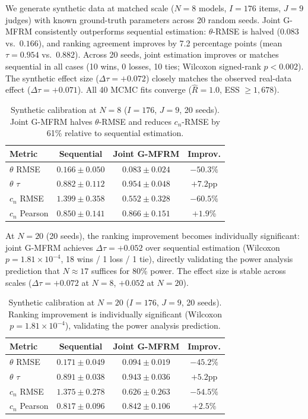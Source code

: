 We generate synthetic data at matched scale ($N = 8$ models, $I = 176$ items, $J = 9$ judges) with known ground-truth parameters across 20 random seeds. Joint G-MFRM consistently outperforms sequential estimation: $\theta$-RMSE is halved ($0.083$ vs.\ $0.166$), and ranking agreement improves by 7.2 percentage points (mean $\tau = 0.954$ vs.\ $0.882$). Across 20 seeds, joint estimation improves or matches sequential in all cases (10 wins, 0 losses, 10 ties; Wilcoxon signed-rank $p < 0.002$). The synthetic effect size ($\Delta\tau = +0.072$) closely matches the observed real-data effect ($\Delta\tau = +0.071$). All 40 MCMC fits converge ($\hat{R} = 1.0$, ESS $\geq 1{,}678$).

\begin{table}[h]
\centering
\small
\begin{tabular}{lccc}
\toprule
\textbf{Metric} & \textbf{Sequential} & \textbf{Joint G-MFRM} & \textbf{Improv.} \\
\midrule
$\theta$ RMSE & $0.166 \pm 0.050$ & $0.083 \pm 0.024$ & $-50.3\%$ \\
$\theta$ $\tau$ & $0.882 \pm 0.112$ & $0.954 \pm 0.048$ & $+7.2$pp \\
$c_n$ RMSE & $1.399 \pm 0.358$ & $0.552 \pm 0.328$ & $-60.5\%$ \\
$c_n$ Pearson & $0.850 \pm 0.141$ & $0.866 \pm 0.151$ & $+1.9$\% \\
\bottomrule
\end{tabular}
\caption{Synthetic calibration at $N = 8$ ($I = 176$, $J = 9$, 20 seeds). Joint G-MFRM halves $\theta$-RMSE and reduces $c_n$-RMSE by 61\% relative to sequential estimation.}
\label{tab:synthetic_calibration}
\end{table}

At $N = 20$ (20 seeds), the ranking improvement becomes individually significant: joint G-MFRM achieves $\Delta\tau = +0.052$ over sequential estimation (Wilcoxon $p = 1.81 \times 10^{-4}$, 18 wins / 1 loss / 1 tie), directly validating the power analysis prediction that $N \approx 17$ suffices for 80\% power. The effect size is stable across scales ($\Delta\tau = +0.072$ at $N = 8$, $+0.052$ at $N = 20$).

\begin{table}[h]
\centering
\small
\begin{tabular}{lccc}
\toprule
\textbf{Metric} & \textbf{Sequential} & \textbf{Joint G-MFRM} & \textbf{Improv.} \\
\midrule
$\theta$ RMSE & $0.171 \pm 0.049$ & $0.094 \pm 0.019$ & $-45.2\%$ \\
$\theta$ $\tau$ & $0.891 \pm 0.038$ & $0.943 \pm 0.036$ & $+5.2$pp \\
$c_n$ RMSE & $1.375 \pm 0.278$ & $0.626 \pm 0.263$ & $-54.5\%$ \\
$c_n$ Pearson & $0.817 \pm 0.096$ & $0.842 \pm 0.106$ & $+2.5\%$ \\
\bottomrule
\end{tabular}
\caption{Synthetic calibration at $N = 20$ ($I = 176$, $J = 9$, 20 seeds). Ranking improvement is individually significant (Wilcoxon $p = 1.81 \times 10^{-4}$), validating the power analysis prediction.}
\label{tab:synthetic_calibration_n20}
\end{table}


